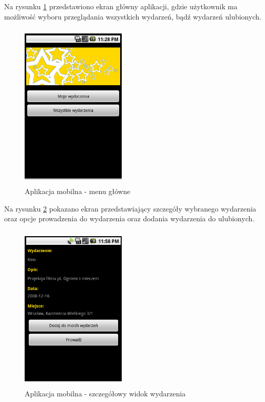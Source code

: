 \documentclass[a4paper]{article}
\begin{document}
Na rysunku \ref{android-menu} przedstawiono ekran główny aplikacji, gdzie użytkownik ma możliwość wyboru przeglądania wszystkich wydarzeń, bądź wydarzeń ulubionych.

\begin{figure}[!h]
\begin{center}
  \includegraphics[width=5cm, height=8cm]{android-menu.png}
  \caption{Aplikacja mobilna - menu główne
  \label{android-menu}}
\end{center}
\end{figure}

Na rysunku \ref{android-szczegoly} pokazano ekran przedstawiający szczegóły wybranego wydarzenia oraz opcje prowadzenia do wydarzenia oraz dodania wydarzenia do ulubionych.

\begin{figure}[!h]
\begin{center}
  \includegraphics[width=5cm, height=8cm]{android-szczegoly.png}
  \caption{Aplikacja mobilna - szczegółowy widok wydarzenia
  \label{android-szczegoly}}
\end{center}
\end{figure}
\end{document}

